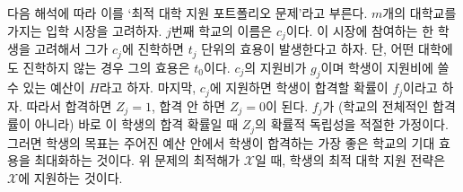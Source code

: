 \documentclass[12pt]{article} %
\newif\ifen
\theoremstyle{definition}
\theoremstyle{definition}
\begin{document}
\ifen
We refer to this problem as the \emph{optimal college application portfolio,} as follows: Consider a college market with $m$ colleges. The $j$th college is named $c_j$. Consider a single prospective student in this market, and let each $t_j$-value indicate the utility she associates with attending $c_j$, where her utility is $t_0$ if she does not attend college. Let $g_j$ denote the application fee for $c_j$ and $H$ the student's total budget to spend on application fees. Finally, let $f_j$ denote her probability of being admitted to $c_j$ if she applies, so that $Z_j$ equals one if she is admitted and zero if not. It is appropriate to assume that the $Z_j$ are probabilistically independent as long as $f_j$ are probabilities estimated specifically for this student (as opposed to generic acceptance rates). Then the student's objective is to maximize the expected utility associated with the best school she gets into within this budget. Her optimal college application strategy is given by the solution $\mathcal{X}$ to the problem above, where $\mathcal{X}$ represents the set of schools to which she applies.
\else
다음 해석에 따라 이를 `최적 대학 지원 포트폴리오 문제'라고 부른다. $m$개의 대학교를 가지는 입학 시장을 고려하자. $j$번째 학교의 이름은 $c_j$이다. 이 시장에 참여하는 한 학생을 고려해서 그가 $c_j$에 진학하면 $t_j$ 단위의 효용이 발생한다고 하자. 단, 어떤 대학에도 진학하지 않는 경우 그의 효용은 $t_0$이다. $c_j$의 지원비가 $g_j$이며 학생이 지원비에 쓸 수 있는 예산이 $H$라고 하자. 마지막, $c_j$에 지원하면 학생이 합격할 확률이 $f_j$이라고 하자. 따라서 합격하면 $Z_j = 1$, 합격 안 하면 $Z_j = 0$이 된다. $f_j$가 (학교의 전체적인 합격률이 아니라) 바로 이 학생의 합격 확률일 때 $Z_j$의 확률적 독립성을 적절한 가정이다. 그러면 학생의 목표는 주어진 예산 안에서 학생이 합격하는 가장 좋은 학교의 기대 효용을 최대화하는 것이다. 위 문제의 최적해가 $\mathcal{X}$일 때, 학생의 최적 대학 지원 전략은 $\mathcal{X}$에 지원하는 것이다.
\fi
\end{document}
